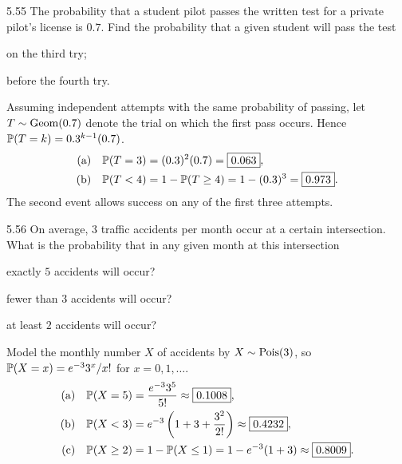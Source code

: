 \documentclass[11pt,oneside]{article}
\begin{document}

\begin{exercise}{5.55}
The probability that a student pilot passes the written test for a private pilot's license is $0.7$. Find the probability that a given student will pass the test
\begin{exercisesubparts}
\item on the third try;
\item before the fourth try.
\end{exercisesubparts}
\end{exercise}
\begin{solution}
Assuming independent attempts with the same probability of passing, let $T\sim\operatorname{Geom}(0.7)$ denote the trial on which the first pass occurs. Hence $\mathbb{P}(T=k)=0.3^{k-1}(0.7)$.
\begin{align*}
\textup{(a)}\quad \mathbb{P}(T=3)&=(0.3)^2(0.7)=\boxed{0.063},\\
\textup{(b)}\quad \mathbb{P}(T<4)&=1-\mathbb{P}(T\ge4)=1-(0.3)^3=\boxed{0.973}.
\end{align*}
The second event allows success on any of the first three attempts.
\end{solution}

\begin{exercise}{5.56}
On average, $3$ traffic accidents per month occur at a certain intersection. What is the probability that in any given month at this intersection
\begin{exercisesubparts}
\item exactly $5$ accidents will occur?
\item fewer than $3$ accidents will occur?
\item at least $2$ accidents will occur?
\end{exercisesubparts}
\end{exercise}
\begin{solution}
Model the monthly number $X$ of accidents by $X\sim\operatorname{Pois}(3)$, so $\mathbb{P}(X=x)=e^{-3}3^x/x!$ for $x=0,1,\ldots$.
\begin{align*}
\textup{(a)}\quad \mathbb{P}(X=5)&=\frac{e^{-3}3^5}{5!}\approx\boxed{0.1008},\\
\textup{(b)}\quad \mathbb{P}(X<3)&=e^{-3}\left(1+3+\frac{3^2}{2!}\right)\approx\boxed{0.4232},\\
\textup{(c)}\quad \mathbb{P}(X\ge2)&=1-\mathbb{P}(X\le1)=1-e^{-3}(1+3)\approx\boxed{0.8009}.
\end{align*}
\end{solution}
\end{document}
